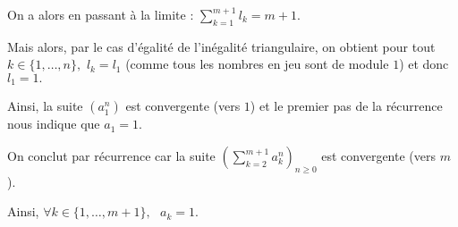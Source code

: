 On a alors en passant à la limite : $\displaystyle \sum_{k=1}^{m+1}l_{k}=m+1.$

Mais alors, par le cas d'égalité de l'inégalité triangulaire, on obtient pour tout $k\in\{1,\ldots,n\},$ $l_{k}=l_{1}$ (comme tous les nombres en jeu sont de module $1$) et donc $l_{1}=1.$

Ainsi, la suite $(a_{1}^{n})$  est convergente (vers $1$) et le premier pas de la récurrence nous indique que $a_{1}=1.$

On conclut par récurrence car la suite $\displaystyle \left(\sum_{k=2}^{m+1}a_{k}^{n}\right)_{n\geq 0}$ est convergente (vers $m$).

Ainsi, $\displaystyle \forall k\in \{1,\ldots,m+1\},\mbox{ } a_{k}=1.$